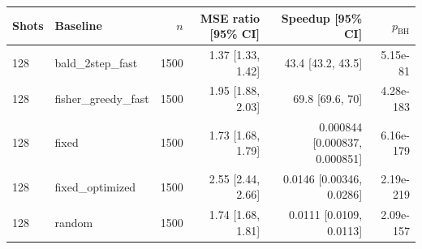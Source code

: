 \begin{tabular}{llrrrr}
\toprule
Shots & Baseline & $n$ & MSE ratio [95\% CI] & Speedup [95\% CI] & $p_{\mathrm{BH}}$ \\
\midrule
128 & bald\_2step\_fast & 1500 & 1.37 [1.33, 1.42] & 43.4 [43.2, 43.5] & 5.15e-81 \\
128 & fisher\_greedy\_fast & 1500 & 1.95 [1.88, 2.03] & 69.8 [69.6, 70] & 4.28e-183 \\
128 & fixed & 1500 & 1.73 [1.68, 1.79] & 0.000844 [0.000837, 0.000851] & 6.16e-179 \\
128 & fixed\_optimized & 1500 & 2.55 [2.44, 2.66] & 0.0146 [0.00346, 0.0286] & 2.19e-219 \\
128 & random & 1500 & 1.74 [1.68, 1.81] & 0.0111 [0.0109, 0.0113] & 2.09e-157 \\
\bottomrule
\end{tabular}
